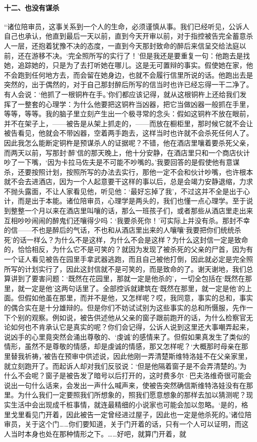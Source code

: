 \paragraph*{十二、也没有谋杀}
\par “诸位陪审员，这事关系到一个人的生命，必须谨慎从事。我们已经听见，公诉人自己也承认，他直到最后一天以前，直到今天开审以前，对于指控被告完全蓄意杀人一层，还抱着犹豫不决的态度，一直到今天那封致命的醉后来信呈交给法庭以前，还在游移不决。‘完全照所写的实行了！’但是我还是要重复一句：他跑去是找她，追踪她的，只是为了去打听她在哪儿。这是无可置辩的事实。假使她在家，他不会跑到任何地方去，而会留在她身边，也就不会履行信里所说的话。他跑出去是突然的，出于偶然的，对于自己那封醉后所写的信当时也许已经忘得一干二净了。有人会说：‘他抓了一根铜杵在手。’你们都应该记得，就从这根铜杵上还给我们发挥了一整套的心理学：为什么他要把这铜杵当凶器，把它当做凶器一般抓在手里，等等，等等。我的脑子里立刻产生出一个极寻常的念头：假如这铜杵不放在眼前，并不在架子上，——被告是从架上抓走的，——而放在橱柜里，那时候它就不会让被告看见，他就会不带凶器，空着两手跑去，这样当时也许就不会杀死任何人了。因此我怎么能断定铜杵是预谋杀人的证据呢？不错，他在酒店里嚷着要杀死父亲，而两天以前，写那封‘醉’信的那天晚上，他十分安静，在酒店里只和一个商店伙计吵了一下嘴，‘因为卡拉马佐夫是不可能不吵嘴的。’我要回答的是假使他有意谋杀，还要按照计划，按照所写的办法去实行，那他一定不会和伙计吵嘴，也许根本就不会去进酒店，因为一个人起意要干这样的事以后，总是会竭力安静退缩，力求不抛头露面，不让人家看见他，听见他：‘最好忘掉了我’，不过这并不全是出于心计，而是出于本能。诸位陪审员，心理学是两头的，我们也懂一点心理学。至于说到整整一个月以来在酒店里叫嚷的话，那么一班孩子们，或者那些从酒店里走出来互相吵吵闹闹的醉鬼们还嚷得少吗：‘我要杀死你！’可实际上并没有杀。那封不幸的信——不也是醉后的气话，不也和从酒店里出来的人嚷嚷‘我要把你们统统杀死’的话一样么？为什么不是这样，为什么不会是这样？为什么这封信一定是致命的，恰恰相反，为什么它不是可笑的？就因为发现了被杀死的父亲的尸首，因为有一个证人看见被告在园里手拿武器逃跑，而且自己被他打倒，因此就必定是完全照所写的计划实行了，因此这封信就不是可笑的，而是致命的了。谢天谢地，我们总算讲到了要害问题：‘既然在花园里，那就一定是他杀的’，一切全包括在‘既然在那里，就一定是他’这两句话里了。全部控诉就建筑在‘既然在那里，就一定是他’的上面。但假如他虽在那里，而并不是他，又怎样呢？哎，我同意，事实的总和，事实的偶合实在是十分雄辩的。但是你们不妨试试别为这些事实的总和所慑服，先作一下个别的观察。例如说，被告供述他从父亲的窗子跟前跑开的话，为什么检察官无论如何也不肯承认它是真实的呢？你们会记得，公诉人说到这里还大事嘲弄起来，说凶手的心里竟突然会涌出尊敬的、‘虔诚’的感情来了。但假如果真发生了类似的情形，虽然不是尊敬的情感，却是虔诚的情感，那又怎样呢？‘大概那时母亲在那里替我祈祷，’被告在预审中供述说，因此他刚一弄清楚斯维特洛娃不在父亲家里，就立刻跑开了。而起诉人却对我们反驳说：‘但是他隔着窗子是不会弄清楚的。’为什么不会呢？窗子是被告发了暗号以后打开的，这时费多尔·巴夫洛维奇很可能会说出一句什么话来，会发出一声什么喊声来，使被告突然确信斯维特洛娃没有在那里。为什么我们一定要照我们所想象的，照我们愿意想象的那样去加以猜测呢？现实生活中会出现成千桩事情，就连最精细的小说家也可能会加以忽略。‘是的，格里戈里看见门开着，因此被告一定曾经进过屋子，因此也一定是他杀死的。’诸位陪审员，关于这个门……你们要知道，关于门开着的话，只有一个人可以证明，而这人当时本身也处在那种情形之下。……好吧，就算门开着，就